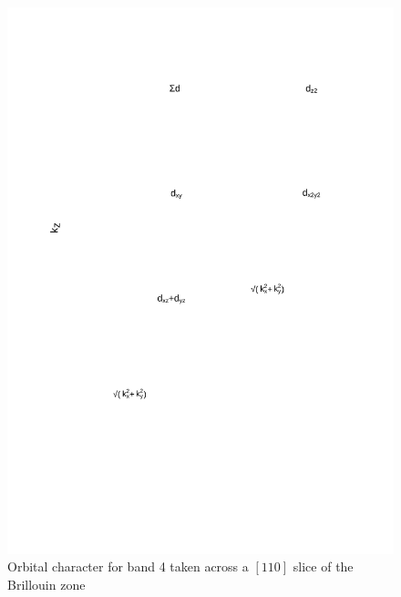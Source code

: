 \begin{figure}[h!]
    \begin{center}
        \includegraphics[scale=0.7]{Chapter3-dHvABaFe2P2/Figures/AngleDepMeasurements/BandCharacterPlot/Band4_110Slice_BandCharacter}
        \caption{Orbital character for band 4 taken across a $[110]$ slice of the Brillouin zone}
        \label{Fig:Appendix:BandCharacter110Band4}
    \end{center}
\end{figure}
